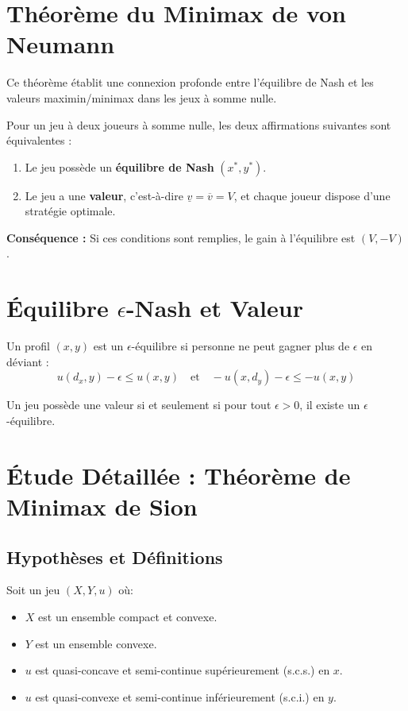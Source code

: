 \section{Théorème du Minimax de von Neumann}

Ce théorème établit une connexion profonde entre l'équilibre de Nash et les valeurs maximin/minimax dans les jeux à somme nulle.

\begin{theoreme}
Pour un jeu à deux joueurs à somme nulle, les deux affirmations suivantes sont équivalentes :
\begin{enumerate}
    \item Le jeu possède un \textbf{équilibre de Nash} $(x^*, y^*)$.
    \item Le jeu a une \textbf{valeur}, c'est-à-dire $\underline{v} = \overline{v} = V$, et chaque joueur dispose d'une stratégie optimale.
\end{enumerate}
\textbf{Conséquence :} Si ces conditions sont remplies, le gain à l'équilibre est $(V, -V)$.
\end{theoreme}
\section{Équilibre $\epsilon$-Nash et Valeur}

\begin{definition}
Un profil $(x, y)$ est un $\epsilon$-équilibre si personne ne peut gagner plus de $\epsilon$ en déviant :
$$u(d_x, y) - \epsilon \le u(x, y) \quad \text{et} \quad -u(x, d_y) - \epsilon \le -u(x, y)$$
\end{definition}

\begin{proposition}
Un jeu possède une valeur si et seulement si pour tout $\epsilon > 0$, il existe un $\epsilon$-équilibre.
\end{proposition}

\section{Étude Détaillée : Théorème de Minimax de Sion}

\subsection{Hypothèses et Définitions}
Soit un jeu $(X, Y, u)$ où:
\begin{itemize}
    \item $X$ est un ensemble compact et convexe.
    \item $Y$ est un ensemble convexe.
    \item $u$ est quasi-concave et semi-continue supérieurement (s.c.s.) en $x$.
    \item $u$ est quasi-convexe et semi-continue inférieurement (s.c.i.) en $y$.
\end{itemize}

